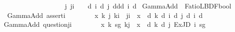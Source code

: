 \begin{isabellebody}
\ \ \ \ \ \ \ \ \ \ \ \ \ \ \ \ \ \ {\isacharbar}{\kern0pt}\ {\isasymominus}\ {\isasymRightarrow}\ {\isacharparenleft}{\kern0pt}{\isasymforall}j{\isachardot}{\kern0pt}\ j{\isasymnoteq}i\ {\isasymlongrightarrow}\ {\isasymGamma}\ {\isasymTurnstile}\ {\isasymD}\isactrlsup d\ i\ {\isacharparenleft}{\kern0pt}{\isasymB}\isactrlsup d\ j\ {\isacharparenleft}{\kern0pt}{\isasymnot}\isactrlsup d{\isasymnot}\isactrlsup d{\isacharparenleft}{\kern0pt}{\isasymB}\isactrlsup d\ i\ {\isacharbraceleft}{\kern0pt}{\isasymphi}{\isacharbraceright}{\kern0pt}\isactrlsup d{\isacharparenright}{\kern0pt}{\isacharparenright}{\kern0pt}{\isacharparenright}{\kern0pt}{\isacharparenright}{\kern0pt}{\isacharparenright}{\kern0pt}{\isacharparenright}{\kern0pt}{\isachardoublequoteclose}%
\isadelimdocument
%
\endisadelimdocument
%
\isatagdocument
%
\isamarkuptrue%
%
\endisatagdocument
{\isafolddocument}%
%
\isadelimdocument
%
\endisadelimdocument
{}\isamarkupfalse%
\ GammaAdd\ {\isacharcolon}{\kern0pt}{\isacharcolon}{\kern0pt}\ {\isachardoublequoteopen}FatioL{\isasymRightarrow}{\isacharparenleft}{\kern0pt}BDF{\isasymRightarrow}bool{\isacharparenright}{\kern0pt}{\isachardoublequoteclose}\ \isanewline
\ \ \ \ {\isachardoublequoteopen}GammaAdd\ assert{\isacharbrackleft}{\kern0pt}i{\isacharcomma}{\kern0pt}{\isasymphi}{\isacharbrackright}{\kern0pt}\ {\isacharequal}{\kern0pt}\isanewline
\ \ \ \ \ \ \ {\isacharparenleft}{\kern0pt}{\isasymlambda}x{\isachardot}{\kern0pt}\ {\isasymexists}k\ j{\isachardot}{\kern0pt}\ k{\isasymnoteq}i\ {\isasymand}\ j{\isasymnoteq}i\ {\isasymand}\ x\ {\isacharequal}{\kern0pt}\ {\isasymB}\isactrlsup d\ k\ {\isacharparenleft}{\kern0pt}{\isasymD}\isactrlsup d\ i\ {\isacharparenleft}{\kern0pt}{\isasymB}\isactrlsup d\ j\ {\isacharparenleft}{\kern0pt}{\isasymB}\isactrlsup d\ i\ {\isacharbraceleft}{\kern0pt}{\isasymphi}{\isacharbraceright}{\kern0pt}\isactrlsup d{\isacharparenright}{\kern0pt}{\isacharparenright}{\kern0pt}{\isacharparenright}{\kern0pt}{\isacharparenright}{\kern0pt}{\isachardoublequoteclose}\isanewline
\ \ {\isacharbar}{\kern0pt}\ {\isachardoublequoteopen}GammaAdd\ question{\isacharbrackleft}{\kern0pt}j{\isacharcomma}{\kern0pt}i{\isacharcomma}{\kern0pt}{\isasymphi}{\isacharbrackright}{\kern0pt}\ {\isacharequal}{\kern0pt}\isanewline
\ \ \ \ \ \ \ {\isacharparenleft}{\kern0pt}{\isasymlambda}x{\isachardot}{\kern0pt}\ {\isasymexists}k\ sg{\isachardot}{\kern0pt}\ k{\isasymnoteq}j\ {\isasymand}\ x\ {\isacharequal}{\kern0pt}\ {\isasymB}\isactrlsup d\ k\ {\isacharparenleft}{\kern0pt}{\isasymD}\isactrlsup d\ j\ {\isacharparenleft}{\kern0pt}ExJD\ i\ sg\ {\isasymphi}{\isacharparenright}{\kern0pt}{\isacharparenright}{\kern0pt}{\isacharparenright}{\kern0pt}{\isachardoublequoteclose}\isanewline

\end{isabellebody}
